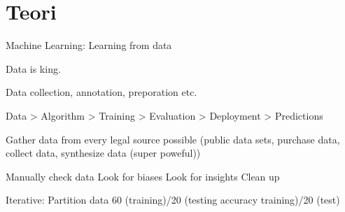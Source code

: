 



\section{Teori}

Machine Learning: Learning from data

Data is king.

Data collection, annotation, preporation etc.

Data > Algorithm > Training > Evaluation > Deployment > Predictions

	Gather data from every legal source possible (public data sets, purchase data, collect data, synthesize data (super poweful))

	Manually check data
	Look for biases
	Look for insights
	Clean up

	Iterative: Partition data 60 (training)/20 (testing accuracy training)/20 (test)

